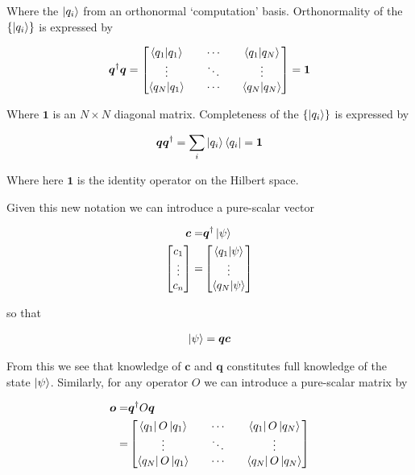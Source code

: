 \documentclass[12pt]{article}
\newcommand{\bv}[1]{\boldsymbol{#1}}
\begin{document}
Where the ${\ket{q_i}}$ from an orthonormal `computation' basis.
Orthonormality of the $\{\ket{q_i}\}$ is expressed by

\begin{align}
\bv{q}^{\dag}\bv{q} = 
\begin{bmatrix}
\braket{q_1|q_1} && \cdots && \braket{q_1|q_N}\\
\vdots && \ddots && \vdots \\
\braket{q_N|q_1} && \cdots && \braket{q_N|q_N}
\end{bmatrix} = \bv{1}
\end{align}

Where $\bv{1}$ is an $N\times N$ diagonal matrix.
Completeness of the $\{\ket{q_i}\}$ is expressed by

\begin{align}
\bv{q}\bv{q}^{\dag} = \sum_i \ket{q_i}\bra{q_i} = \bv{1}
\end{align}

Where here $\bv{1}$ is the identity operator on the Hilbert space.

Given this new notation we can introduce a pure-scalar vector

\begin{align}
\bv{c} =& \bv{q}^{\dag}\ket{\psi}\\
\begin{bmatrix}
c_1\\ \vdots\\ c_n
\end{bmatrix} =& 
\begin{bmatrix}
\braket{q_1|\psi}\\ \vdots \\ \braket{q_N|\psi} 
\end{bmatrix}
\end{align}

so that

\begin{align}
\ket{\psi} = \bv{q}\bv{c}
\end{align}

From this we see that knowledge of $\bv{c}$ and $\bv{q}$ constitutes full knowledge of the state $\ket{\psi}$.
Similarly, for any operator $O$ we can introduce a pure-scalar matrix by

\begin{align}
\bv{o} =& \bv{q}^{\dag}O\bv{q}\\
=& \begin{bmatrix}
\bra{q_1}O\ket{q_1} && \cdots && \bra{q_1}O\ket{q_N}\\
\vdots && \ddots && \vdots \\
\bra{q_N}O\ket{q_1} && \cdots && \bra{q_N}O\ket{q_N}
\end{bmatrix}
\end{align}
\end{document}

